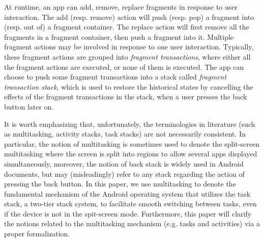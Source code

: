 
At runtime, an app can add, remove, replace fragments in response to user interaction. 
The add (resp. remove) action will push (resp. pop) a fragment into (resp. out of) a fragment container. The replace action will first remove all the fragments in a fragment container, then push a fragment into it.
Multiple fragment actions may be involved in response to one user interaction. Typically, these fragment actions are grouped into \emph{fragment transactions}, where either all the fragment actions are executed,  or none of them is executed. 
The app can choose to push some fragment transactions into a stack called \emph{fragment transaction stack}, which is used to restore the historical states by cancelling the effects of the fragment transactions in the stack, when a user presses the back button later on.


It is worth emphasizing that, unfortunately, 
the terminologies in literature (such as multitasking, activity stacks, task stacks) are not necessarily consistent. In particular, 
the notion of multitasking is sometimes used to denote the split-screen multitasking where the screen is split into regions to allow several apps displayed simultaneously, moreover, the notion of back stack is widely used in Android documents, but may (misleadingly) refer to any stack regarding the action of pressing the back button. 
In this paper, we use multitasking to denote the fundamental mechanism of the Android operating system that utilizes the task stack, a two-tier stack system, to facilitate smooth switching between tasks, even if the device is not in the spit-screen mode. 
Furthermore, this paper will clarify the notions related to the multitasking mechanism (e.g. tasks and activities) via a proper formalization. 

